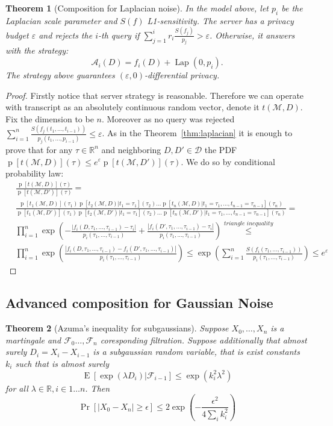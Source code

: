 \documentclass[12pt,letterpaper]{article}
\newcommand{\R}{\mathbb{R}}
\let\eps\varepsilon
\newcommand{\E}{\operatorname{E}}
\newcommand{\p}{\operatorname{p}}
\newtheorem{theorem}{Theorem}
\newcommand{\Lap}{\operatorname{Lap}}
\begin{document}
\begin{theorem}[Composition for Laplacian noise]
  \label{thm:adapt_laplacian}
In the model above, let $p_i$ be the Laplacian scale parameter and $S(f)$ L1-sensitivity. The server has a privacy budget $\eps$ and rejects the $i$-th query if $\sum_{j=1}^{i} r_i \frac{S(f_j)}{p_j} > \eps$. Otherwise, it answers with the strategy:
$$\mathcal{A}_i(D) = f_{i}(D) + \Lap(0, p_i).$$
The strategy above guarantees $(\eps, 0)$-differential privacy.
\end{theorem}
\begin{proof}
Firstly notice that server strategy is reasonable. Therefore we can operate with transcript as an absolutely continuous random vector, denote it $t(\mathcal{M}, D)$. Fix the dimension to be $n$. Moreover as no query was rejected $\sum_{i=1}^{n}\frac{S(f_j(t_1, \ldots, t_{i-1}))}{p_j(t_1, \ldots, p_{i - 1})} \leq \eps$. As in the Theorem~\ref{thm:laplacian} it is enough to prove that for any $\tau \in \R^n$ and neighboring $D, D' \in \mathcal{D}$ the PDF $\p[t(\mathcal{M}, D)](\tau) \leq e^{\eps}\p[t(\mathcal{M}, D')](\tau)$. We do so by conditional probability law:
\begin{align*}
&\frac{\p[t(\mathcal{M}, D)](\tau)}{\p[t(\mathcal{M}, D')](\tau)} = \\
&\frac{\p[t_1(\mathcal{M}, D)](\tau_1)\p[t_2(\mathcal{M}, D) | t_1=\tau_1](\tau_2)  \ldots  \p[t_n(\mathcal{M}, D) | t_1=\tau_1, \ldots, t_{n - 1}=\tau_{n - 1}](\tau_n)}{\p[t_1(\mathcal{M}, D')](\tau_1)\p[t_2(\mathcal{M}, D') | t_1=\tau_1](\tau_2)  \ldots  \p[t_n(\mathcal{M}, D') | t_1=\tau_1, \ldots, t_{n - 1}=\tau_{n - 1}](\tau_n)} = \\
&\prod_{i=1}^{n}\exp\left(-\frac{|f_i(D, \tau_1, \ldots, \tau_{i - 1}) - \tau_i|}{p_i(\tau_1, \ldots, \tau_{i - 1})} + \frac{|f_i(D', \tau_1, \ldots, \tau_{i - 1}) - \tau_i|}{p_i(\tau_1, \ldots, \tau_{i - 1})}\right) \overset{\textit{triangle inequality}}{\leq} \\
&\prod_{i=1}^{n}\exp\left(\frac{|f_i(D, \tau_1, \ldots, \tau_{i - 1}) - f_i(D', \tau_1, \ldots, \tau_{i - 1})|}{p_i(\tau_1, \ldots, \tau_{i - 1})}\right) \leq \exp(\sum_{i=1}^n \frac{S(f_i(\tau_1, \ldots, \tau_{i - 1}))}{p_i(\tau_1, \ldots, \tau_{i - 1})}) \leq e^{\eps}
\end{align*}
\end{proof}

\subsection{Advanced composition for Gaussian Noise}
\begin{theorem}[Azuma's inequality for subgaussians]
  \label{thm:azuma}
  Suppose $X_0, \ldots, X_n$ is a martingale and $\mathcal{F}_0 \ldots, \mathcal{F}_n$ coresponding filtration. Suppose additionally that almost surely
  $D_i = X_i - X_{i - 1}$ is a subgaussian random variable, that is exist constants $k_i$ such that is almost surely
  $$\E[\exp\left(\lambda D_i\right) | \mathcal{F}_{i - 1}] \leq \exp(k_i^2\lambda^2)$$
  for all $\lambda \in \R, i \in 1\ldots n$.
  Then 
  $$\Pr[|X_0 - X_{n}|\geq \epsilon] \leq 2\exp\left(-\frac{\epsilon^2}{4\sum_{i}k_i^2}\right)$$
\end{theorem}
\end{document}
